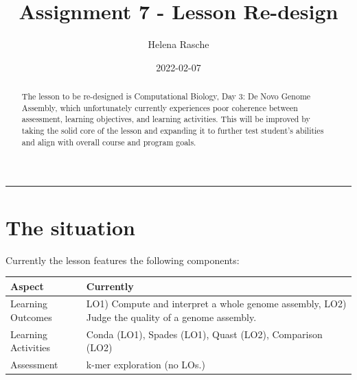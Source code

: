 \documentclass[paper=a4,justified,a4paper]{tufte-handout}
\title[A7 - Lesson Re-design]{Assignment 7 - Lesson Re-design}
\author{Helena Rasche}
\date{2022-02-07}
\begin{document}
\maketitle
\begin{abstract}
The lesson to be re-designed is Computational Biology, Day 3: De Novo
Genome Assembly, which unfortunately currently experiences poor
coherence between assessment, learning objectives, and learning
activities. This will be improved by taking the solid core of the lesson
and expanding it to further test student's abilities and align with
overall course and program goals.
\end{abstract}
\noindent\rule{5in}{0.4pt}


\hypertarget{the-situation}{%
\section{The situation}\label{the-situation}}

Currently the lesson features the following components:

\begin{longtable}[]{@{}ll@{}}
\toprule
\begin{minipage}[b]{0.31\columnwidth}\raggedright
Aspect\strut
\end{minipage} & \begin{minipage}[b]{0.63\columnwidth}\raggedright
Currently\strut
\end{minipage}\tabularnewline
\midrule
\endhead
\begin{minipage}[t]{0.31\columnwidth}\raggedright
Learning Outcomes\strut
\end{minipage} & \begin{minipage}[t]{0.63\columnwidth}\raggedright
LO1) Compute and interpret a whole genome assembly, LO2) Judge the
quality of a genome assembly.\strut
\end{minipage}\tabularnewline
\begin{minipage}[t]{0.31\columnwidth}\raggedright
Learning Activities\strut
\end{minipage} & \begin{minipage}[t]{0.63\columnwidth}\raggedright
Conda (LO1), Spades (LO1), Quast (LO2), Comparison (LO2)\strut
\end{minipage}\tabularnewline
\begin{minipage}[t]{0.31\columnwidth}\raggedright
Assessment\strut
\end{minipage} & \begin{minipage}[t]{0.63\columnwidth}\raggedright
k-mer exploration (no LOs.)\strut
\end{minipage}\tabularnewline
\bottomrule
\end{longtable}
\end{document}
